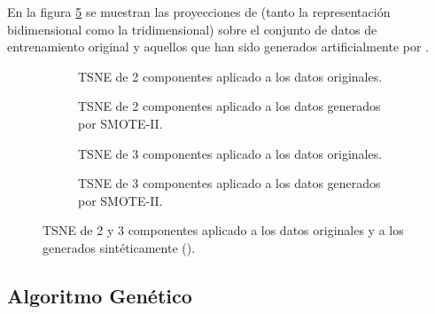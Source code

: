            En la figura \ref{TSNEImages} se muestran las proyecciones de  (tanto la representación bidimensional como la tridimensional) sobre el conjunto de datos de entrenamiento original y aquellos que han sido generados artificialmente por .


            \begin{figure}
                \centering
                \begin{subfigure}[b]{0.4\textwidth}
                    \centering
                    
                    \caption{TSNE de 2 componentes aplicado a los datos originales.}
                    \label{TSNEImages:Clean2D}
                \end{subfigure}
                \begin{subfigure}[b]{0.4\textwidth}
                    \centering
                    
                    \caption{TSNE de 2 componentes aplicado a los datos generados por SMOTE-II.}
                    \label{TSNEImages:Train2D}

                \end{subfigure}
                \begin{subfigure}[b]{0.4\textwidth}
                    \centering
                    
                    \caption{TSNE de 3 componentes aplicado a los datos originales.}
                    \label{TSNEImages:Clean3D}
                \end{subfigure}
                \begin{subfigure}[b]{0.4\textwidth}
                    \centering
                    
                    \caption{TSNE de 3 componentes aplicado a los datos generados por SMOTE-II.}
                    \label{TSNEImages:Train3D}
                \end{subfigure}
                \caption{TSNE de 2 y 3 componentes aplicado a los datos originales y a los generados sintéticamente ().}
                \label{TSNEImages}
             \end{figure}


    \subsection{Algoritmo Genético}


